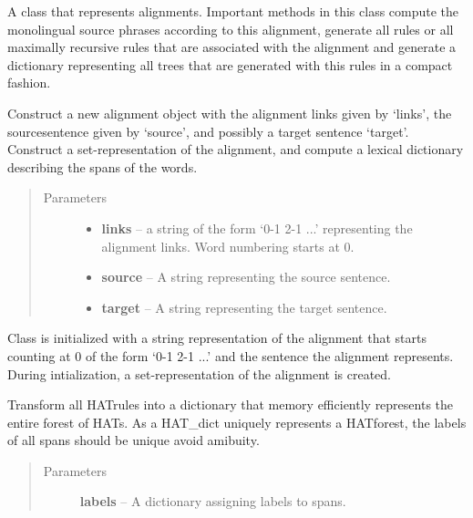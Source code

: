 \documentclass[letterpaper,10pt,english]{sphinxmanual}
\begin{document}
\begin{fulllineitems}
\label{alignments:alignments.Alignments}
A class that represents alignments. Important methods in this class
compute the monolingual source phrases according to this alignment,
generate all rules or all maximally recursive rules that are
associated with the alignment and generate a dictionary representing
all trees that are generated with this rules in a compact fashion.

Construct a new alignment object with the alignment links
given by `links', the sourcesentence given by `source', and 
possibly a target sentence `target'. Construct a set-representation
of the alignment, and compute a lexical dictionary describing
the spans of the words.
\begin{quote}\begin{description}
\item[{Parameters}] \leavevmode\begin{itemize}
\item {} 
\textbf{links} -- a string of the form `0-1 2-1 ...' representing
the alignment links. Word numbering starts at 0.

\item {} 
\textbf{source} -- A string representing the source sentence.

\item {} 
\textbf{target} -- A string representing the target sentence.

\end{itemize}

\end{description}\end{quote}

Class is initialized with a string representation of
the alignment that starts counting at 0 of the form 
`0-1 2-1 ...' and the sentence the alignment represents.
During intialization, a set-representation of the alignment
is created.

\begin{fulllineitems}
\label{alignments:alignments.Alignments.HAT_dict}
Transform all HATrules into a dictionary that memory
efficiently represents the entire forest of HATs.
As a HAT\_dict uniquely represents a HATforest, the labels
of all spans should be unique avoid amibuity.
\begin{quote}\begin{description}
\item[{Parameters}] \leavevmode
\textbf{labels} -- A dictionary assigning labels to spans.


\end{description}
\end{quote}
\end{fulllineitems}
\end{fulllineitems}
\end{document}
